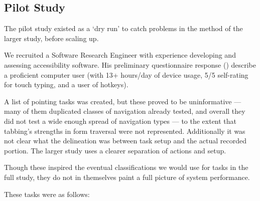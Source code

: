 \documentclass[a4paper, 12pt]{report}
\begin{document}
\subsection{Pilot Study}
The pilot study existed as a `dry run' to catch problems in the method of the larger study, before scaling up.

We recruited a Software Research Engineer with experience developing and assessing accessibility software. His preliminary questionnaire response () describe a proficient computer user (with 13+ hours/day of device usage, 5/5 self-rating for touch typing, and a user of hotkeys).

A list of pointing tasks was created, but these proved to be uninformative --- many of them duplicated classes of navigation already tested, and overall they did not test a wide enough spread of navigation types --- to the extent that tabbing's strengths in form traversal were not represented. Additionally it was not clear what the delineation was between task setup and the actual recorded portion. The larger study uses a clearer separation of actions and setup.

Though these inspired the eventual classifications we would use for tasks in the full study, they do not in themselves paint a full picture of system performance.

These tasks were as follows:
\end{document}
